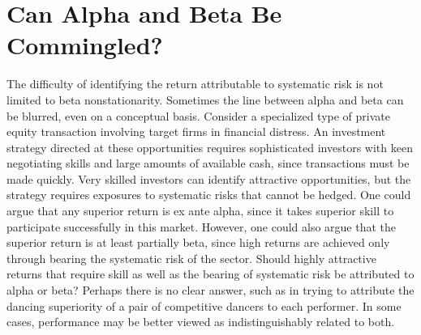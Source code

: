 \documentclass[11pt]{article}
\begin{document}
\section*{Can Alpha and Beta Be Commingled?}
The difficulty of identifying the return attributable to systematic risk is not limited to beta nonstationarity. Sometimes the line between alpha and beta can be blurred, even on a conceptual basis. Consider a specialized type of private equity transaction involving target firms in financial distress. An investment strategy directed at these opportunities requires sophisticated investors with keen negotiating skills and large amounts of available cash, since transactions must be made quickly. Very skilled investors can identify attractive opportunities, but the strategy requires exposures to systematic risks that cannot be hedged. One could argue that any superior return is ex ante alpha, since it takes superior skill to participate successfully in this market. However, one could also argue that the superior return is at least partially beta, since high returns are achieved only through bearing the systematic risk of the sector. Should highly attractive returns that require skill as well as the bearing of systematic risk be attributed to alpha or beta? Perhaps there is no clear answer, such as in trying to attribute the dancing superiority of a pair of competitive dancers to each performer. In some cases, performance may be better viewed as indistinguishably related to both.
\end{document}
